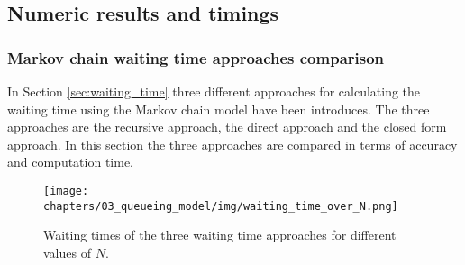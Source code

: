 \subsection{Numeric results and timings}\label{sec:truncation_effect}



\subsubsection{Markov chain waiting time approaches comparison}
\label{sec:waiting_time_approach_comparison}

In Section \ref{sec:waiting_time} three different approaches for calculating
the waiting time using the Markov chain model have been introduces.
The three approaches are the recursive approach, the direct approach and
the closed form approach.
In this section the three approaches are compared in terms of accuracy and
computation time.



\begin{figure}[H]
    \texttt{[image: chapters/03\_queueing\_model/img/waiting\_time\_over\_N.png]}
    \caption{
        Waiting times of the three waiting time approaches for different
        values of \(N\).
    }
    \label{fig:waiting_time_accuracy_over_N}
\end{figure}
    



